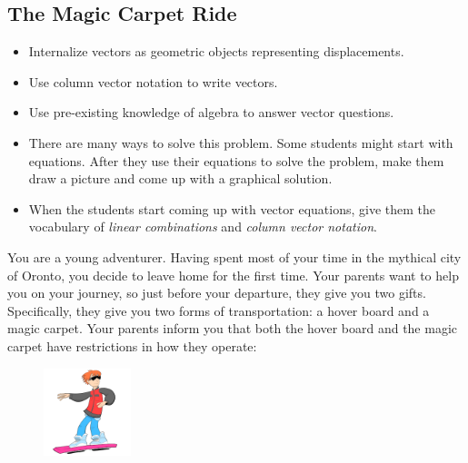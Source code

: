 \begin{iola}
\section*{The Magic Carpet Ride}

\begin{slide}
\question
\begin{annotation}
	\begin{goals}
		\begin{itemize}
			\item Internalize vectors as geometric objects representing
				displacements.

			\item Use column vector notation to write vectors.

			\item Use pre-existing knowledge of algebra to answer vector
				questions.
		\end{itemize}
	\end{goals}
	\begin{notes}

		\begin{itemize}
			\item There are many ways to solve this problem.
				Some students
				might start with equations. After they use their
				equations to solve the problem, make them draw a picture
				and come up with a graphical solution.

			\item When the students start coming up with vector equations,
				give them the vocabulary of \emph{linear
				combinations}
				and \emph{column vector notation}.
		\end{itemize}
	\end{notes}
\end{annotation}
You are a young adventurer. Having spent most of your time in the mythical city of Oronto,
	you decide to leave home for the first time. Your parents
want to help you on your journey, so just before your departure, they give you two
gifts. Specifically, they give you two forms of transportation: a hover board and
a magic carpet. Your parents inform you that both the hover board and the magic carpet
have restrictions in how they operate:

\begin{minipage}{\linewidth}
	\vspace{.5cm}
	\begin{figure}
	\vspace{-.8cm}
	\includegraphics[width=1in]{images/HoverBoard-small.png}
	\end{figure}


\end{minipage}
\end{slide}
\end{iola}
